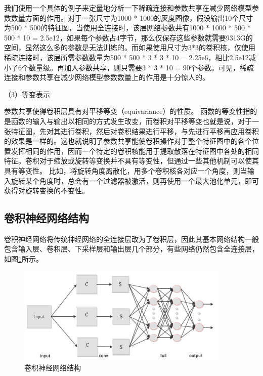 
我们使用一个具体的例子来定量地分析一下稀疏连接和参数共享在减少网络模型参数数量方面的作用。对于一张尺寸为1000 * 1000的灰度图像，假设输出10个尺寸为500 * 500的特征图，当使用全连接时，该层网络参数共有1000 * 1000 * 500 * 500 * 10 = 2.5e12，如果每个参数占4字节，那么仅保存这些参数就需要9313G的空间，显然这么多的参数是无法训练的。而如果使用尺寸为3*3的卷积核，仅使用稀疏连接时，该层所需参数数量为500 * 500 * 3 * 3 * 10 = 2.25e6，相比2.5e12减小了6个数量级。再加入参数共享，则只需要3 * 3 * 10 = 90个参数。可见，稀疏连接和参数共享在减少网络模型参数数量上的作用是十分惊人的。

（3）等变表示

参数共享使得卷积层具有对平移等变（equivariance）的性质。
函数的等变性指的是函数的输入与输出以相同的方式发生改变，而卷积对平移等变也就是说，对于一张特征图，先对其进行卷积，然后对卷积结果进行平移，与先进行平移再应用卷积的效果是一样的。这也就说明了参数共享能使卷积操作对于整个特征图中的各个位置发挥相同的作用，因而一个特定的卷积核能用于提取散落在特征图中各处的相同特征。卷积对于缩放或旋转等变换并不具有等变性，但通过一些其他机制可以使其具有等变性。
比如，将旋转角度离散化，用多个卷积核各对应一个角度，则当输入旋转某个角度时，总会有一个过滤器被激活，则再使用一个最大池化单元，即可获得对旋转变换的不变性。

\subsection{卷积神经网络结构}
卷积神经网络将传统神经网络的全连接层改为了卷积层，因此其基本网络结构一般包含输入层、卷积层、下采样层和输出层几个部分，有些网络仍然包含全连接层，如图\ref{fig:3_1_卷积神经网络结构}所示。

\begin{figure}[htb] %
	\centering
	\includegraphics[width=4in]{figures/3_1_卷积神经网络结构}
	\caption{卷积神经网络结构} \label{fig:3_1_卷积神经网络结构}
\end{figure}

